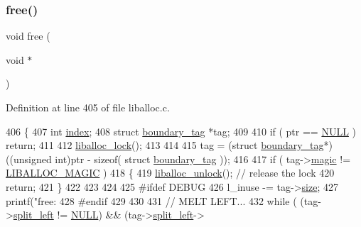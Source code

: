 \subsubsection{\texorpdfstring{free()}{free()}}
{\footnotesize\ttfamily void free (\begin{DoxyParamCaption}\item[{void $\ast$}]{ }\end{DoxyParamCaption})}



Definition at line 405 of file liballoc.\+c.


\begin{DoxyCode}
406 \{
407     \textcolor{keywordtype}{int} \hyperlink{a00126_adfc426eed5361508d62c6e8f484bd270_adfc426eed5361508d62c6e8f484bd270}{index};
408     \textcolor{keyword}{struct }\hyperlink{a00126}{boundary\_tag} *tag;
409 
410     \textcolor{keywordflow}{if} ( ptr == \hyperlink{a00038_a070d2ce7b6bb7e5c05602aa8c308d0c4_a070d2ce7b6bb7e5c05602aa8c308d0c4}{NULL} ) \textcolor{keywordflow}{return};
411 
412     \hyperlink{a00038_a8b5670e4594b0b6f8be78fe17f0c3b53_a8b5670e4594b0b6f8be78fe17f0c3b53}{liballoc\_lock}();
413     
414 
415         tag = (\textcolor{keyword}{struct }\hyperlink{a00126}{boundary\_tag}*)((\textcolor{keywordtype}{unsigned} \textcolor{keywordtype}{int})ptr - \textcolor{keyword}{sizeof}( \textcolor{keyword}{struct }
      \hyperlink{a00126}{boundary\_tag} ));
416     
417         \textcolor{keywordflow}{if} ( tag->\hyperlink{a00126_a96a8bec3c60c81b8c41239169ec70b6c_a96a8bec3c60c81b8c41239169ec70b6c}{magic} != \hyperlink{a00035_af6b1d459ffa3c81e2456acf8d4268330_af6b1d459ffa3c81e2456acf8d4268330}{LIBALLOC\_MAGIC} ) 
418         \{
419             \hyperlink{a00038_aedc23f198b2882d41d0caa316453967b_aedc23f198b2882d41d0caa316453967b}{liballoc\_unlock}();       \textcolor{comment}{// release the lock}
420             \textcolor{keywordflow}{return};
421         \}
422 
423 
424 
425 \textcolor{preprocessor}{        #ifdef DEBUG}
426         l\_inuse -= tag->\hyperlink{a00126_a29b056a39f6022d32468e7913e6df936_a29b056a39f6022d32468e7913e6df936}{size};
427         printf(\textcolor{stringliteral}{"free: %
428 \textcolor{preprocessor}{        #endif}
429         
430 
431         \textcolor{comment}{// MELT LEFT...}
432         \textcolor{keywordflow}{while} ( (tag->\hyperlink{a00126_a4daa8c3768359ea8d0f46ef907616cc2_a4daa8c3768359ea8d0f46ef907616cc2}{split\_left} != \hyperlink{a00038_a070d2ce7b6bb7e5c05602aa8c308d0c4_a070d2ce7b6bb7e5c05602aa8c308d0c4}{NULL}) && (tag->\hyperlink{a00126_a4daa8c3768359ea8d0f46ef907616cc2_a4daa8c3768359ea8d0f46ef907616cc2}{split\_left}->
}
\end{DoxyCode}

